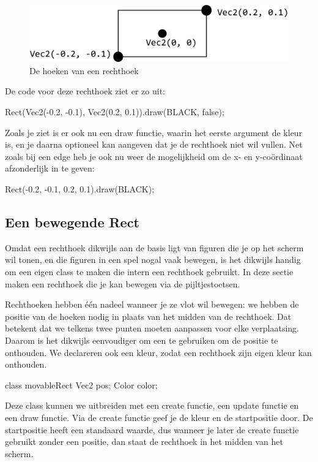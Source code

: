 \begin{figure}[h]
\centering
\includegraphics[width=0.8\linewidth]{../images/rectangle.png}
\caption[]{De hoeken van een rechthoek}
\label{fig:rect}
\end{figure}

De code voor deze rechthoek ziet er zo uit:

\begin{code}
Rect(Vec2(-0.2, -0.1), Vec2(0.2, 0.1)).draw(BLACK, false);
\end{code}

Zoals je ziet is er ook nu een draw functie, waarin het eerste argument de kleur is, en je daarna optioneel kan aangeven dat je de rechthoek niet wil vullen. Net zoals bij een edge heb je ook nu weer de mogelijkheid om de x- en y-co\"ordinaat afzonderlijk in te geven:

\begin{code}
Rect(-0.2, -0.1, 0.2, 0.1).draw(BLACK);
\end{code}

\subsection{Een bewegende Rect}
Omdat een rechthoek dikwijls aan de basis ligt van figuren die je op het scherm wil tonen, en die figuren in een spel nogal vaak bewegen, is het dikwijls handig om een eigen class te maken die intern een rechthoek gebruikt. In deze sectie maken een rechthoek die je kan bewegen via de pijltjestoetsen.

Rechthoeken hebben \'e\'en nadeel wanneer je ze vlot wil bewegen: we hebben de positie van de hoeken nodig in plaats van het midden van de rechthoek. Dat betekent dat we telkens twee punten moeten aanpassen voor elke verplaatsing. Daarom is het dikwijls eenvoudiger om een  te gebruiken om de positie te onthouden. We declareren ook een kleur, zodat een rechthoek zijn eigen kleur kan onthouden.

\begin{code}
class movableRect {
  Vec2 pos;
	Color color;
}
\end{code}

Deze class kunnen we uitbreiden met een create functie, een update functie en een draw functie. Via de create functie geef je de kleur en de startpositie door. De startpositie heeft een standaard waarde, dus wanneer je later de create functie gebruikt zonder een positie, dan staat de rechthoek in het midden van het scherm.

